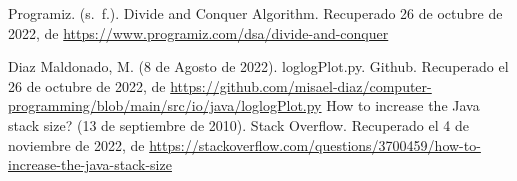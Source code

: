\begin{thebibliography}{1}

Programiz. (s. f.). Divide and Conquer Algorithm. Recuperado 26 de octubre de 2022, de \url{https://www.programiz.com/dsa/divide-and-conquer}

Diaz Maldonado, M. (8 de Agosto de 2022). loglogPlot.py. Github. Recuperado el 26 de octubre de 2022, de \url{https://github.com/misael-diaz/computer-programming/blob/main/src/io/java/loglogPlot.py}
How to increase the Java stack size? (13 de septiembre de 2010). Stack Overflow. Recuperado el 4 de noviembre de 2022, de  \url{https://stackoverflow.com/questions/3700459/how-to-increase-the-java-stack-size}

\end{thebibliography}
